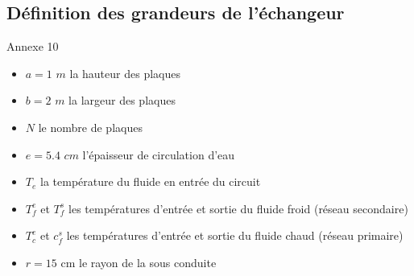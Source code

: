 \documentclass[hyperref={pdfpagelabels=false}]{beamer}
\begin{document}
%



\subsection*{Définition des grandeurs de l'échangeur}\label{a8}
\begin{frame}{Annexe 10 {\textcolor{ultramarine}{\hyperlink{e21}{}}} }

	\begin{itemize}
	\item $a = 1$ $m$ la hauteur des plaques
	\item $b = 2$ $m$ la largeur des plaques
	\item $N$ le nombre de plaques
	\item $e = 5.4$ $cm$ l'épaisseur de circulation d'eau
	\item $T_e $ la température du fluide en entrée du circuit  
	\item $T_f^e$ et $T_f^s$ les températures d'entrée et sortie du fluide froid (réseau secondaire)
	\item $T_c^e$ et $c_f^s$ les températures d'entrée et sortie du fluide chaud (réseau primaire)
	\item $r = 15$ cm le rayon de la sous conduite
	\end{itemize}
\end{frame}


%
\end{document}
